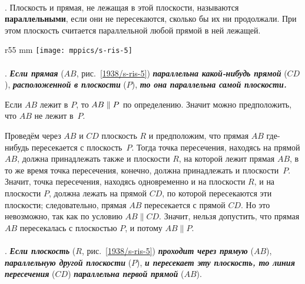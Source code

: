 \paragraph{}\label{1938/s9}
. Плоскость и прямая, не лежащая в этой плоскости, называются \textbf{параллельными}, если они не пересекаются, сколько бы их ни продолжали.
При этом плоскость считается параллельной любой прямой в ней лежащей.

\begin{wrapfigure}{r}{55 mm}
\vskip-6mm
\centering
\texttt{[image: mppics/s-ris-5]}
\caption{}\label{1938/s-ris-5}
\end{wrapfigure}

\paragraph{}\label{1938/s10}
\mbox{.} \textbf{\emph{Если прямая}} ($AB$, рис.~\ref{1938/s-ris-5}) \textbf{\emph{параллельна какой-нибудь прямой}} ($CD$), \textbf{\emph{расположенной в плоскости}} ($P$), \textbf{\emph{то она параллельна самой плоскости.}}

Если $AB$ лежит в $P$, то $AB\z\parallel P$ по определению.
Значит можно предположить, что $AB$ не лежит в~$P$.

Проведём через $AB$ и $CD$ плоскость $R$ и предположим, что прямая $AB$ где-нибудь пересекается с плоскость~$P$.
Тогда точка пересечения, находясь на прямой $AB$, должна принадлежать также и плоскости $R$, на которой лежит прямая $AB$, в то же время точка пересечения, конечно, должна принадлежать и плоскости~$P$.
Значит, точка пересечения, находясь одновременно и на плоскости $R$, и на плоскости $P$, должна лежать на прямой $CD$, по которой пересекаются эти плоскости;
следовательно, прямая $AB$ пересекается с прямой $CD$.
Но это невозможно, так как по условию $AB\parallel CD$.
Значит, нельзя допустить, что прямая $AB$ пересекалась с плоскостью $P$, и потому $AB\parallel P$.

\paragraph{}\label{1938/s11}
. \textbf{\emph{Если плоскость}} ($R$, рис.~\ref{1938/s-ris-5}) \textbf{\emph{проходит через прямую}} ($AB$), \textbf{\emph{параллельную другой плоскости}} ($P$), \textbf{\emph{и пересекает эту плоскость, то линия пересечения}} ($CD$) \textbf{\emph{параллельна первой прямой}} ($AB$).


